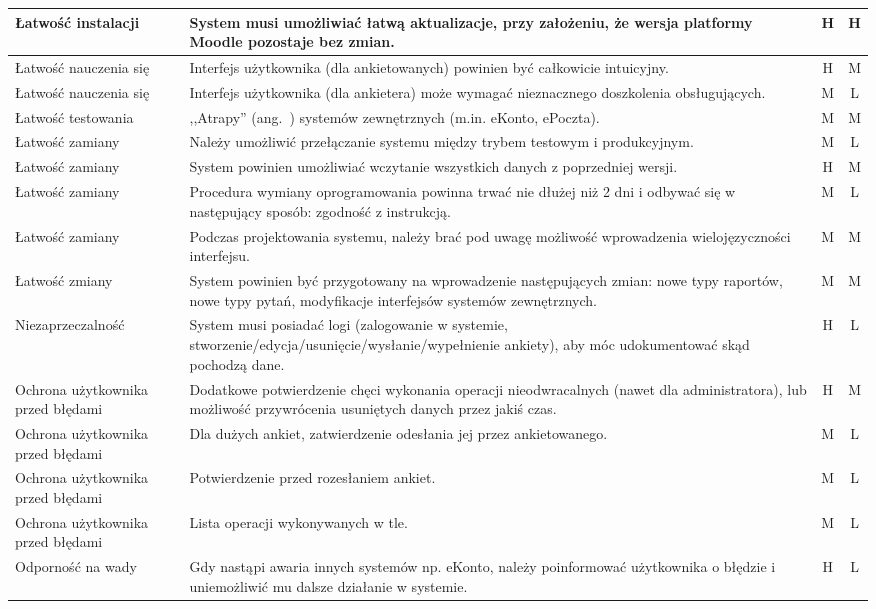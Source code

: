 \begin{center}
\begin{longtable}{ | p{4cm} | p{9cm} | c | c | }
%
Łatwość instalacji & System musi umożliwiać łatwą aktualizacje, przy założeniu, że wersja platformy Moodle pozostaje bez zmian. & H & H \\ \hline
%
Łatwość nauczenia się & Interfejs użytkownika (dla ankietowanych) powinien być całkowicie intuicyjny. & H & M \\ \hline
Łatwość nauczenia się & Interfejs użytkownika (dla ankietera) może wymagać nieznacznego doszkolenia obsługujących. & M & L \\ \hline
%
Łatwość testowania & ,,Atrapy'' (ang.~{mock}) systemów zewnętrznych (m.in. eKonto, ePoczta). & M & M \\ \hline
Łatwość zamiany & Należy umożliwić przełączanie systemu między trybem testowym i produkcyjnym. & M & L \\ \hline
%
Łatwość zamiany & System powinien umożliwiać wczytanie wszystkich danych z poprzedniej wersji. & H & M \\ \hline
Łatwość zamiany & Procedura wymiany oprogramowania powinna trwać nie dłużej niż 2 dni i odbywać się w następujący sposób: zgodność z instrukcją. & M & L \\ \hline
Łatwość zamiany & Podczas projektowania systemu, należy brać pod uwagę możliwość wprowadzenia wielojęzyczności interfejsu. & M & M \\ \hline
%
Łatwość zmiany & System powinien być przygotowany na wprowadzenie następujących zmian: nowe typy raportów, nowe typy pytań, modyfikacje interfejsów systemów zewnętrznych. & M & M \\ \hline
%
Niezaprzeczalność & System musi posiadać logi (zalogowanie w systemie, stworzenie\slash edycja\slash usunięcie\slash wysłanie\slash wypełnienie ankiety), aby móc udokumentować skąd pochodzą dane. & H & L \\ \hline
%
Ochrona użytkownika przed błędami & Dodatkowe potwierdzenie chęci wykonania operacji nieodwracalnych (nawet dla administratora), lub możliwość przywrócenia usuniętych danych przez jakiś czas. & H & M \\ \hline
Ochrona użytkownika przed błędami & Dla dużych ankiet, zatwierdzenie odesłania jej przez ankietowanego. & M & L \\ \hline
Ochrona użytkownika przed błędami & Potwierdzenie przed rozesłaniem ankiet. & M & L \\ \hline
Ochrona użytkownika przed błędami & Lista operacji wykonywanych w tle. & M & L \\ \hline
%
Odporność na wady & Gdy nastąpi awaria innych systemów np. eKonto, należy poinformować użytkownika o błędzie i uniemożliwić mu dalsze działanie w systemie. & H & L \\ \hline

\end{longtable}
\end{center}

